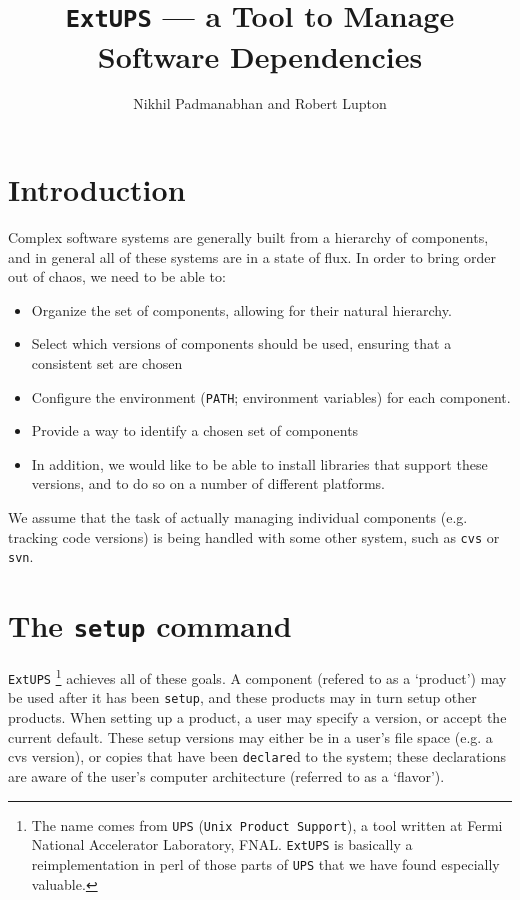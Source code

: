 \documentclass{article}
\newcommand{\code}[1]{\texttt{#1}}
\newcommand{\eups}{\code{ExtUPS}}
\begin{document}
\title{\eups{} --- a Tool to Manage Software Dependencies}
\author{Nikhil Padmanabhan and Robert Lupton}

\maketitle


\section{Introduction}

Complex software systems are generally built from a hierarchy of
components, and in general all of these systems are in a state of
flux.  In order to bring order out of chaos, we need to be able to:
\begin{itemize}
  \item Organize the set of components, allowing for their natural
    hierarchy.

  \item
    Select which versions of components should be used, ensuring
    that a consistent set are chosen

  \item
    Configure the environment (\code{PATH}; environment variables)
    for each component.

  \item
    Provide a way to identify a chosen set of components

  \item
    In addition, we would like to be able to install libraries that support
    these versions, and to do so on a number of different platforms.
\end{itemize}

We assume that the task of actually managing individual components
(e.g. tracking code versions) is being handled with some other system,
such as \code{cvs} or \code{svn}.

\section{The \code{setup} command}

\eups
\footnote{%
  The name comes from \code{UPS} (\code{Unix Product Support}), a
  tool written at Fermi National Accelerator Laboratory, FNAL. \eups{}
  is basically a reimplementation in perl of those parts of \code{UPS}
  that we have found especially valuable.}
achieves all of these goals. A component (refered to as a `product')
may be used after it has been \code{setup}, and these products may
in turn setup other products. When setting up a product, a user
may specify a version, or accept the current default. These setup versions
may either be in a user's file space (e.g. a cvs version), or copies
that have been \code{declare}d to the system; these declarations are
aware of the user's computer architecture (referred to as a `flavor').
\end{document}
